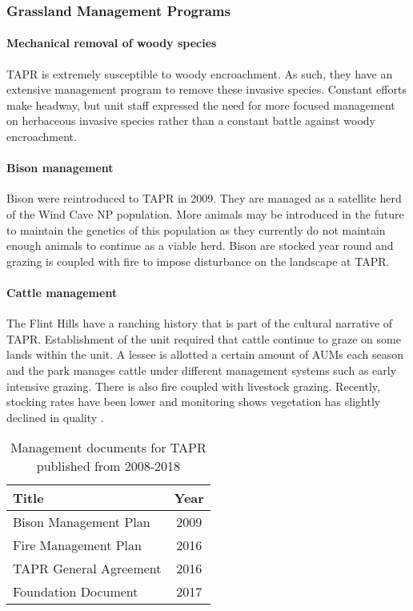 \subsubsection{Grassland Management Programs}

\paragraph{Mechanical removal of woody species} 
TAPR is extremely susceptible to woody encroachment. 
As such, they have an extensive management program to remove these invasive species. 
Constant efforts make headway, but unit staff expressed the need for more focused management on herbaceous invasive species rather than a constant battle against woody encroachment.

\paragraph{Bison management} 
Bison were reintroduced to TAPR in 2009. 
They are managed as a satellite herd of the Wind Cave NP population. 
More animals may be introduced in the future to maintain the genetics of this population as they currently do not maintain enough animals to continue as a viable herd. 
Bison are stocked year round and grazing is coupled with fire to impose disturbance on the landscape at TAPR.

\paragraph{Cattle management} 
The Flint Hills have a ranching history that is part of the cultural narrative of TAPR. 
Establishment of the unit required that cattle continue to graze on some lands within the unit. 
A lessee is allotted a certain amount of AUMs each season and the park manages cattle under different management systems such as early intensive grazing.
There is also fire coupled with livestock grazing.
Recently, stocking rates have been lower and monitoring shows vegetation has slightly declined in quality \citep{leis2018}.

\begin{table}[h]
	\centering
\caption[TAPR management documents]
	{Management documents for TAPR published from 2008-2018}
\label{tab:TAPRmandocs}
\begin{tabular}{lc}
		\toprule
		Title & Year\tabularnewline
		\midrule
Bison Management Plan & 2009 \tabularnewline
Fire Management Plan & 2016 \tabularnewline
TAPR General Agreement & 2016 \tabularnewline
Foundation Document & 2017 \tabularnewline
\bottomrule
\end{tabular}
\end{table}

